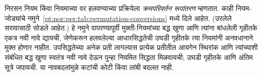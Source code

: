 निरसन नियम
\Elim{\lor} किंवा
\Elim{\lexists} नियमाच्या
वर हलवण्याच्या प्रक्रियेला
\emph{क्रमपरिवर्तन रूपांतरण}
म्हणतात. काही नियम-जोड्यांचे
नमुने~\ref{pt:nor:per:tab:permutation-conversions}
मध्ये दिले आहेत.
(उरलेले सरावासाठी सोडले आहेत.)
हे नमुने वापरण्यापूर्वी मुक्ती-नियमांच्या बद्ध खुणा आणि
त्यांना बांधलेली गृहीतके एकत्र नवी नावे द्यायची,
जेणेकरून हलवलेल्या आधारसिद्धतेची उघडी गृहीतके
त्या नियमांनी अनवधानाने मुक्त होणार नाहीत.
उपसिद्धतेच्या अनेक प्रती लागल्यास प्रत्येक प्रतीतील
आयगेन स्थिरांक आणि त्यांच्याशी संबंधित बद्ध खुणा
स्वतंत्र नवी नावे देऊन पुन्हा नियमित सिद्धता मिळवायची;
उघडी गृहीतके आणि अंतिम सूत्रे जपायची.
या नावबदलांमुळे कटांची कोटी किंवा लांबी बदलत नाही.





























































































































